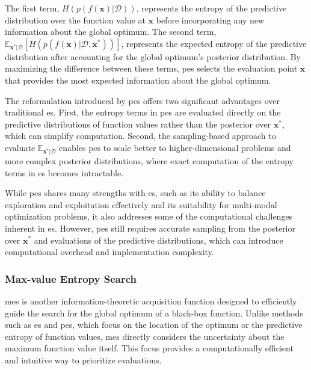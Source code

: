 The first term, $H(p(f(\mathbf{x}) \vert \mathcal{D}))$, represents the entropy of the predictive distribution over the function value at $\mathbf{x}$ before incorporating any new information about the global optimum. The second term, $\mathbb{E}_{\mathbf{x}^* \vert \mathcal{D}} \left[ H(p(f(\mathbf{x}) \vert \mathcal{D}, \mathbf{x}^*)) \right]$, represents the expected entropy of the predictive distribution after accounting for the global optimum's posterior distribution. By maximizing the difference between these terms, \ac{pes} selects the evaluation point $\mathbf{x}$ that provides the most expected information about the global optimum.

The reformulation introduced by \ac{pes} offers two significant advantages over traditional \ac{es}. First, the entropy terms in \ac{pes} are evaluated directly on the predictive distributions of function values rather than the posterior over $\mathbf{x}^*$, which can simplify computation. Second, the sampling-based approach to evaluate $\mathbb{E}_{\mathbf{x}^* \vert \mathcal{D}}$ enables \ac{pes} to scale better to higher-dimensional problems and more complex posterior distributions, where exact computation of the entropy terms in \ac{es} becomes intractable.

While \ac{pes} shares many strengths with \ac{es}, such as its ability to balance exploration and exploitation effectively and its suitability for multi-modal optimization problems, it also addresses some of the computational challenges inherent in \ac{es}. However, \ac{pes} still requires accurate sampling from the posterior over $\mathbf{x}^*$ and evaluations of the predictive distributions, which can introduce computational overhead and implementation complexity.

\subsubsection{Max-value Entropy Search}
\label{section:max_value_entropy_search}

\acf{mes} \citep{wang2017max} is another information-theoretic acquisition function designed to efficiently guide the search for the global optimum of a black-box function. Unlike methods such as \ac{es} and \ac{pes}, which focus on the location of the optimum or the predictive entropy of function values, \ac{mes} directly considers the uncertainty about the maximum function value itself. This focus provides a computationally efficient and intuitive way to prioritize evaluations.

